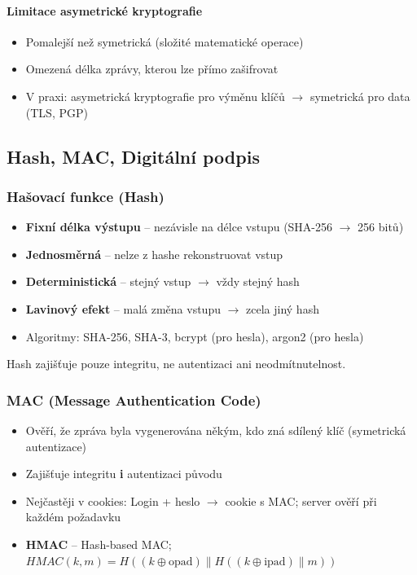 \paragraph{Limitace asymetrické kryptografie}
\begin{itemize}
  \item Pomalejší než symetrická (složité matematické operace)
  \item Omezená délka zprávy, kterou lze přímo zašifrovat
  \item V praxi: asymetrická kryptografie pro výměnu klíčů $\to$ symetrická pro data (TLS, PGP)
\end{itemize}

\subsection{Hash, MAC, Digitální podpis}

\subsubsection{Hašovací funkce (Hash)}

\begin{itemize}
  \item \textbf{Fixní délka výstupu} -- nezávisle na délce vstupu (SHA-256 $\to$ 256 bitů)
  \item \textbf{Jednosměrná} -- nelze z hashe rekonstruovat vstup
  \item \textbf{Deterministická} -- stejný vstup $\to$ vždy stejný hash
  \item \textbf{Lavinový efekt} -- malá změna vstupu $\to$ zcela jiný hash
  \item Algoritmy: SHA-256, SHA-3, bcrypt (pro hesla), argon2 (pro hesla)
\end{itemize}

Hash zajišťuje pouze integritu, ne autentizaci ani neodmítnutelnost.

\subsubsection{MAC (Message Authentication Code)}

\begin{itemize}
  \item Ověří, že zpráva byla vygenerována někým, kdo zná sdílený klíč (symetrická autentizace)
  \item Zajišťuje integritu \textbf{i} autentizaci původu
  \item Nejčastěji v cookies: Login + heslo $\to$ cookie s MAC; server ověří při každém požadavku
  \item \textbf{HMAC} -- Hash-based MAC; $HMAC(k, m) = H((k \oplus \text{opad}) \| H((k \oplus \text{ipad}) \| m))$
\end{itemize}

